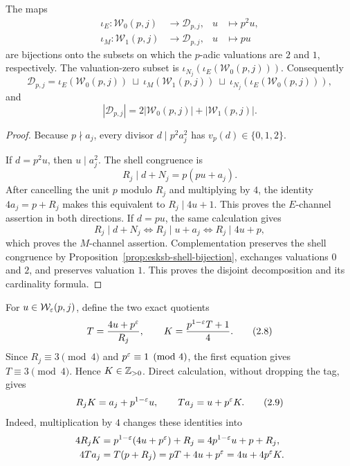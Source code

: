 \begin{proposition}\label{prop:esksb-two-channel}
The maps
\begin{align*}
 \iota_E:\mathcal W_0(p,j)&\longrightarrow\mathscr D_{p,j},
 &u&\longmapsto p^2u,\\
 \iota_M:\mathcal W_1(p,j)&\longrightarrow\mathscr D_{p,j},
 &u&\longmapsto pu
\end{align*}
are bijections onto the subsets on which the \(p\)-adic valuations are \(2\)
and \(1\), respectively.  The valuation-zero subset is
\(\iota_{N_j}(\iota_E(\mathcal W_0(p,j)))\).  Consequently
\begin{equation}
 \mathscr D_{p,j}=
 \iota_E(\mathcal W_0(p,j))\ \sqcup\
 \iota_M(\mathcal W_1(p,j))\ \sqcup\
 \iota_{N_j}(\iota_E(\mathcal W_0(p,j))),                    \tag{2.6}
\end{equation}
and
\begin{equation}
 |\mathscr D_{p,j}|=2|\mathcal W_0(p,j)|+|\mathcal W_1(p,j)|. \tag{2.7}
\end{equation}
\end{proposition}

\begin{proof}
Because \(p\nmid a_j\), every divisor \(d\mid p^2a_j^2\) has
\(v_p(d)\in\{0,1,2\}\).

If \(d=p^2u\), then \(u\mid a_j^2\).  The shell congruence is
\[
 R_j\mid d+N_j=p(pu+a_j).
\]
After cancelling the unit \(p\) modulo \(R_j\) and multiplying by \(4\),
the identity \(4a_j=p+R_j\) makes this equivalent to
\(R_j\mid4u+1\).  This proves the \(E\)-channel assertion in both
directions.  If \(d=pu\), the same calculation gives
\[
 R_j\mid d+N_j
 \Longleftrightarrow R_j\mid u+a_j
 \Longleftrightarrow R_j\mid4u+p,
\]
which proves the \(M\)-channel assertion.  Complementation preserves the
shell congruence by Proposition~\ref{prop:esksb-shell-bijection}, exchanges
valuations \(0\) and \(2\), and preserves valuation \(1\).  This proves the
disjoint decomposition and its cardinality formula.
\end{proof}

For \(u\in\mathcal W_\varepsilon(p,j)\), define the two exact quotients
\begin{equation}
 T=\frac{4u+p^\varepsilon}{R_j},
 \qquad K=\frac{p^{1-\varepsilon}T+1}{4}.                            \tag{2.8}
\end{equation}
Since \(R_j\equiv3\pmod4\) and \(p^\varepsilon\equiv1\pmod4\), the first equation
gives \(T\equiv3\pmod4\).  Hence \(K\in\mathbb Z_{>0}\).  Direct calculation,
without dropping the tag, gives
\begin{equation}
 R_jK=a_j+p^{1-\varepsilon}u,
 \qquad Ta_j=u+p^\varepsilon K.                                    \tag{2.9}
\end{equation}
Indeed, multiplication by \(4\) changes these identities into
\begin{align*}
 4R_jK
 &=p^{1-\varepsilon}(4u+p^\varepsilon)+R_j
 =4p^{1-\varepsilon}u+p+R_j,\\
 4Ta_j
 &=T(p+R_j)
 =pT+4u+p^\varepsilon
 =4u+4p^\varepsilon K.
\end{align*}

